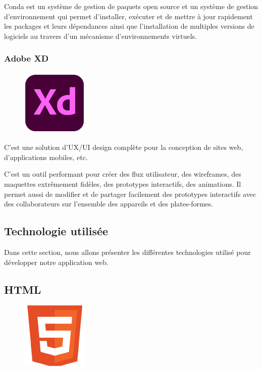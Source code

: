 Conda est un système de gestion de paquets open source et un système de gestion
d’environnement qui permet d’installer, exécuter et de mettre à jour rapidement
les packages et leurs dépendances ainsi que l’installation de multiples versions
de logiciels au travers d’un mécanisme d’environnements virtuels\cite{44}.

\subsubsection*{Adobe XD}
\begin{figure}
    \vspace{-22pt}
    \begin{center}
        \includegraphics[scale=0.36]{images/logo/adobexd.png}
        \label{fig69}
    \end{center}
    \vspace{-20pt}
    \vspace{-10pt}
\end{figure}

C’est une solution d’UX/UI design complète pour la conception de sites web, 
d’applications mobiles, etc.

C’est un outil performant pour créer des flux utilisateur, des wireframes, des
maquettes extrêmement fidèles, des prototypes interactifs, des animations. Il
permet aussi de modifier et de partager facilement des prototypes interactifs
avec des collaborateurs sur l’ensemble des appareils et des
plates-formes\cite{45}.

\subsection{Technologie utilisée}
Dans cette section, nous allons présenter les différentes technologies utilisé
pour développer notre application web.

\subsection{HTML}
\begin{figure}
    \vspace{-22pt}
    \begin{center}
        \includegraphics[scale=0.36]{images/logo/html.png}
        \label{fig70}
    \end{center}
    \vspace{-20pt}
    \vspace{-10pt}
\end{figure}

